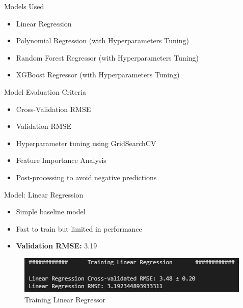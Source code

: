 \documentclass{beamer}
\begin{document}

\begin{frame}{Models Used}
\begin{itemize}
    \item Linear Regression
    \item Polynomial Regression (with Hyperparameters Tuning)
    \item Random Forest Regressor (with Hyperparameters Tuning)
    \item XGBoost Regressor (with Hyperparameters Tuning)
\end{itemize}
\end{frame}

\begin{frame}{Model Evaluation Criteria}
\begin{itemize}
    \item Cross-Validation RMSE
    \item Validation RMSE
    \item Hyperparameter tuning using GridSearchCV
    \item Feature Importance Analysis
    \item Post-processing to avoid negative predictions
\end{itemize}
\end{frame}
    
\begin{frame}{Model: Linear Regression}
  \begin{itemize}
    \item Simple baseline model
    \item Fast to train but limited in performance
    \item \textbf{Validation RMSE:} 3.19
  \end{itemize}
\begin{figure}
\vfill
    \centering
    \includegraphics[width=0.6\linewidth]{images/lr.png}
    \caption{Training Linear Regressor}
    \label{fig:enter-label}
\end{figure}
\end{frame}
\end{document}

